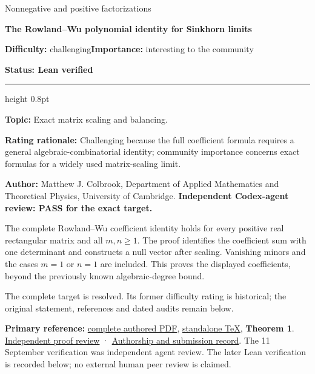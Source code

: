 \documentclass[11pt,a4paper]{article}
\makeatletter
\renewcommand{\subsection}{\Needspace{4\baselineskip}\@startsection{subsection}{2}{0pt}{9pt plus 1pt minus 1pt}{3pt}{\sffamily\bfseries\normalsize\color{ink}}}
\makeatother
\begin{document}
{\sffamily\small\color{muted}Nonnegative and positive
factorizations\par}
\vspace{3pt}
{\raggedright{}\sffamily\bfseries\fontsize{21}{24}\selectfont\color{ink}The
Rowland--Wu polynomial identity for Sinkhorn limits\par}
\vspace{7pt}
{\sffamily\small\textbf{Difficulty:} challenging\quad\textbf{Importance:} interesting
to the community\par}
{\sffamily\small\bfseries\color{accent}Status: Lean verified\par}
\vspace{4pt}
{\color{accent}\hrule height 0.8pt}
\vspace{6pt}
\textbf{Topic:} Exact matrix scaling and balancing.

\textbf{Rating rationale:} Challenging because the full coefficient
formula requires a general algebraic-combinatorial identity; community
importance concerns exact formulas for a widely used matrix-scaling
limit.

\subsection{Resolution --- 2026-09-11}\label{resolution-2026-09-11}

\textbf{Author:} Matthew J. Colbrook, Department of Applied Mathematics
and Theoretical Physics, University of Cambridge. \textbf{Independent
Codex-agent review: PASS for the exact target.}

The complete Rowland--Wu coefficient identity holds for every positive
real rectangular matrix and all \(m,n\ge1\). The proof identifies the
coefficient sum with one determinant and constructs a null vector after
scaling. Vanishing minors and the cases \(m=1\) or \(n=1\) are included.
This proves the displayed coefficients, beyond the previously known
algebraic-degree bound.

The complete target is resolved. Its former difficulty rating is
historical; the original statement, references and dated audits remain
below.

\textbf{Primary reference:}
\href{https://github.com/ajt60gaibb/OpenProblemsInNLA/blob/main/references/colbrook-factorization-2026-09-11/manuscripts/NM-04_sinkhorn_identity.pdf}{complete
authored PDF},
\href{https://github.com/ajt60gaibb/OpenProblemsInNLA/blob/main/references/colbrook-factorization-2026-09-11/manuscripts/NM-04_sinkhorn_identity.tex}{standalone
TeX}, \textbf{Theorem 1}.
\href{https://github.com/ajt60gaibb/OpenProblemsInNLA/blob/main/references/colbrook-factorization-2026-09-11/verification/reviews/NM-04-review.md}{Independent
proof review} ·
\href{https://github.com/ajt60gaibb/OpenProblemsInNLA/blob/main/references/colbrook-factorization-2026-09-11/README.md}{Authorship
and submission record}. The 11 September verification was independent
agent review. The later Lean verification is recorded below; no external
human peer review is claimed.
\end{document}
